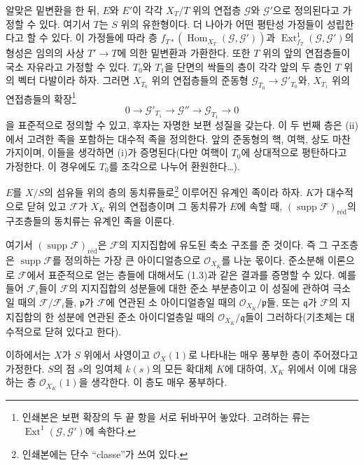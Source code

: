알맞은 밑변환을 한 뒤, $E$와 $E'$이 각각 $X_T/T$ 위의 연접층
$\mathcal G$와 $\mathcal G'$으로 정의된다고 가정할 수 있다. 여기서
$T$는 $S$ 위의 유한형이다. 더 나아가 어떤 평탄성 가정들이 성립한다고
할 수 있다. 이 가정들에 따라 층
$f_{T*}(\operatorname{Hom}_{X_T}(\mathcal G,\mathcal G'))$과
$\operatorname{Ext}^{1}_{f_T}(\mathcal G,\mathcal G')$의 형성은
임의의 사상 $T'\longrightarrow T$에 의한 밑변환과 가환한다. 또한 $T$
위의 앞의 연접층들이 국소 자유라고 가정할 수 있다. $T_0$와 $T_1$을
단면의 싹들의 층이 각각 앞의 두 층인 $T$ 위의 벡터 다발이라 하자. 그러면
$X_{T_0}$ 위의 연접층들의 준동형
$\mathcal G_{T_0}\longrightarrow\mathcal G'_{T_0}$와, $X_{T_1}$ 위의
연접층들의 확장\footnote{인쇄본은 보편 확장의 두
끝 항을 서로 뒤바꾸어 놓았다. 고려하는 류는
$\operatorname{Ext}^1(\mathcal G,\mathcal G')$에 속한다.}
\[
0\longrightarrow\mathcal G'_{T_1}\longrightarrow\mathcal G''
\longrightarrow\mathcal G_{T_1}\longrightarrow0
\]
을 표준적으로 정의할 수 있고, 후자는 자명한 보편 성질을 갖는다. 이 두 번째
층은 (ii)에서 고려한 족을 포함하는 대수적 족을 정의한다. 앞의 준동형의
핵, 여핵, 상도 마찬가지이며, 이들을 생각하면 (i)가 증명된다(다만 여핵이
$T_0$에 상대적으로 평탄하다고 가정한다. 이 경우에도 $T_0$를 조각으로
나누어 환원한다\ldots).

 $E$를 $X/S$의 섬유들 위의 층의
동치류들로\footnote{인쇄본에는 단수 ``classe''가
쓰여 있다.} 이루어진 유계인 족이라 하자. $K$가 대수적으로 닫혀 있고
$\mathcal F$가 $X_K$ 위의 연접층이며 그 동치류가 $E$에 속할 때,
$(\operatorname{supp}\mathcal F)_{\mathrm{réd}}$의 구조층들의 동치류는
유계인 족을 이룬다.

여기서 $(\operatorname{supp}\mathcal F)_{\mathrm{réd}}$은
$\mathcal F$의 지지집합에 유도된 축소 구조를 준 것이다. 즉 그 구조층은
$\operatorname{supp}\mathcal F$를 정의하는 가장 큰 아이디얼층으로
$\mathcal O_{X_K}$를 나눈 몫이다. 준소분해 이론으로 $\mathcal F$에서
표준적으로 얻는 층들에 대해서도 (1.3)과 같은 결과를 증명할 수 있다. 예를
들어 $\mathcal F_i$들이 $\mathcal F$의 지지집합의 성분들에 대한 준소
부분층이고 이 성질에 관하여 극소일 때의 $\mathcal F/\mathcal F_i$들,
$\mathfrak p$가 $\mathcal F$에 연관된 소 아이디얼층일 때의
$\mathcal O_{X_K}/\mathfrak p$들, 또는 $\mathfrak q$가 $\mathcal F$의
지지집합의 한 성분에 연관된 준소 아이디얼층일 때의
$\mathcal O_{X_K}/\mathfrak q$들이 그러하다(기초체는 대수적으로 닫혀 있다고
한다).


이하에서는 $X$가 $S$ 위에서 사영이고 $\mathcal O_X(1)$로 나타내는 매우
풍부한 층이 주어졌다고 가정한다. $S$의 점 $s$의 잉여체 $k(s)$의 모든
확대체 $K$에 대하여, $X_K$ 위에서 이에 대응하는 층
$\mathcal O_{X_K}(1)$을 생각한다. 이 층도 매우 풍부하다.


